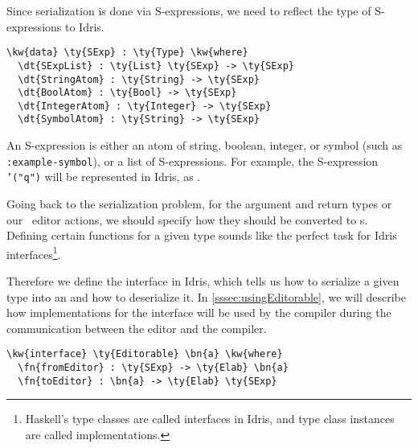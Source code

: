 Since serialization is done via S-expressions, we need to reflect the type of
S-expressions to Idris.

\begin{Verbatim}[framesep=2mm, label=\footnotesize{\normalfont{Idris}}, labelposition=topline]
\kw{data} \ty{SExp} : \ty{Type} \kw{where}
  \dt{SExpList} : \ty{List} \ty{SExp} -> \ty{SExp}
  \dt{StringAtom} : \ty{String} -> \ty{SExp}
  \dt{BoolAtom} : \ty{Bool} -> \ty{SExp}
  \dt{IntegerAtom} : \ty{Integer} -> \ty{SExp}
  \dt{SymbolAtom} : \ty{String} -> \ty{SExp}
\end{Verbatim}

An S-expression is either an atom of string, boolean, integer, or symbol (such
as \texttt{:example-symbol}), or a list of S-expressions.
For example, the S-expression \texttt{'("q")} will be represented in Idris, as
.

Going back to the serialization problem, for the argument and return types or
our \Elab\ editor actions, we should specify how they should be converted to
s.  Defining certain functions for a given type sounds like the
perfect task for Idris interfaces\footnote{Haskell's type classes are called
interfaces in Idris, and type class instances are called implementations.}.

Therefore we define the interface  in Idris, which tells us
how to serialize a given type into an  and how to deserialize it.
In \autoref{sssec:usingEditorable}, we will describe how implementations for
the  interface will be used by the compiler during the
communication between the editor and the compiler.

\label{code:editorable}
\begin{Verbatim}[framesep=2mm, label=\footnotesize{\normalfont{Idris}}, labelposition=topline]
\kw{interface} \ty{Editorable} \bn{a} \kw{where}
  \fn{fromEditor} : \ty{SExp} -> \ty{Elab} \bn{a}
  \fn{toEditor} : \bn{a} -> \ty{Elab} \ty{SExp}
\end{Verbatim}

